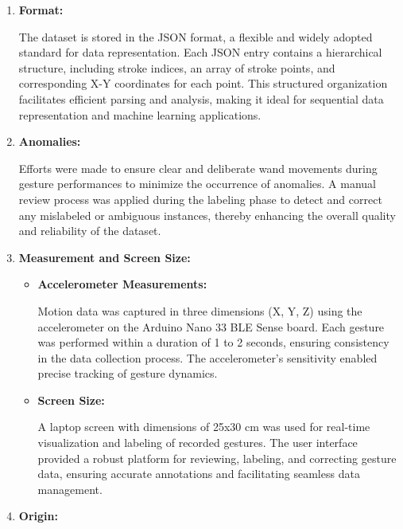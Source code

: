 \begin{enumerate}
	\item \textbf{Format:}
	
	The dataset is stored in the JSON format, a flexible and widely adopted standard for data representation. Each JSON entry contains a hierarchical structure, including stroke indices, an array of stroke points, and corresponding X-Y coordinates for each point. This structured organization facilitates efficient parsing and analysis, making it ideal for sequential data representation and machine learning applications.
	
	
	\item \textbf{Anomalies:}
	
	Efforts were made to ensure clear and deliberate wand movements during gesture performances to minimize the occurrence of anomalies. A manual review process was applied during the labeling phase to detect and correct any mislabeled or ambiguous instances, thereby enhancing the overall quality and reliability of the dataset.
	
	\item \textbf{Measurement and Screen Size:}
	
	\begin{itemize}
		
		\item \textbf{Accelerometer Measurements:}
		
		Motion data was captured in three dimensions (X, Y, Z) using the accelerometer on the Arduino Nano 33 BLE Sense board. Each gesture was performed within a duration of 1 to 2 seconds, ensuring consistency in the data collection process. The accelerometer's sensitivity enabled precise tracking of gesture dynamics.
		
		\item \textbf{Screen Size:}
		
		A laptop screen with dimensions of 25x30 cm was used for real-time visualization and labeling of recorded gestures. The user interface provided a robust platform for reviewing, labeling, and correcting gesture data, ensuring accurate annotations and facilitating seamless data management.
		
	\end{itemize}
	
	\item \textbf{Origin:}
	

\end{enumerate}
